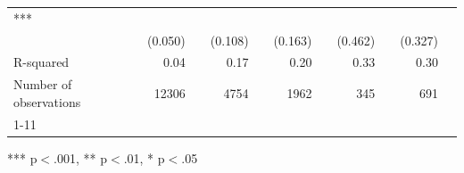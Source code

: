 \documentclass{article}
\begin{document}
\begin{table}[!h]
\begin{tabular}{lllllllllll}
  \multicolumn{1}{l}{***} \\
\multicolumn{1}{l}{} &
  \multicolumn{1}{r}{(0.050)} &
  \multicolumn{1}{l}{} &
  \multicolumn{1}{r}{(0.108)} &
  \multicolumn{1}{l}{} &
  \multicolumn{1}{r}{(0.163)} &
  \multicolumn{1}{l}{} &
  \multicolumn{1}{r}{(0.462)} &
  \multicolumn{1}{l}{} &
  \multicolumn{1}{r}{(0.327)} &
  \multicolumn{1}{l}{} \\
\multicolumn{1}{l}{R-squared} &
  \multicolumn{1}{r}{0.04} &
  \multicolumn{1}{l}{} &
  \multicolumn{1}{r}{0.17} &
  \multicolumn{1}{l}{} &
  \multicolumn{1}{r}{0.20} &
  \multicolumn{1}{l}{} &
  \multicolumn{1}{r}{0.33} &
  \multicolumn{1}{l}{} &
  \multicolumn{1}{r}{0.30} &
  \multicolumn{1}{l}{} \\
\multicolumn{1}{l}{Number of observations} &
  \multicolumn{1}{r}{12306} &
  \multicolumn{1}{l}{} &
  \multicolumn{1}{r}{4754} &
  \multicolumn{1}{l}{} &
  \multicolumn{1}{r}{1962} &
  \multicolumn{1}{l}{} &
  \multicolumn{1}{r}{345} &
  \multicolumn{1}{l}{} &
  \multicolumn{1}{r}{691} &
  \multicolumn{1}{l}{} \\
\cline{1-11}
\end{tabular}

\footnotesize{
*** p$<$.001, ** p$<$.01, * p$<$.05
}
\end{table}
\end{document}

